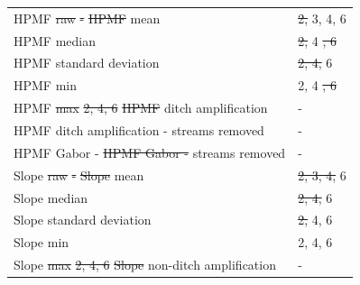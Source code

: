 \documentclass[]{interact}
\theoremstyle{plain}%
\theoremstyle{definition}
\theoremstyle{remark}
\providecommand{\DIFdeltex}[1]{{\protect\color{red}\sout{#1}}}                      %
\providecommand{\DIFdelFL}[1]{\DIFdel{#1}} %
\providecommand{\DIFdelbeginFL}{} %
\providecommand{\DIFdelendFL}{} %
\providecommand{\DIFdel}[1]{\texorpdfstring{\DIFdeltex{#1}}{}} %
\begin{document}
\begin{table} [!htb]
{\begin{tabular}{ll}
      HPMF \DIFdelbeginFL \DIFdelFL{raw }%
\DIFdelFL{- }%
\DIFdelFL{HPMF }\DIFdelendFL mean & \DIFdelbeginFL \DIFdelFL{2, }\DIFdelendFL 3, 4, 6 \\
      HPMF median & \DIFdelbeginFL \DIFdelFL{2, }\DIFdelendFL 4 \DIFdelbeginFL \DIFdelFL{, 6 }\DIFdelendFL \\
      HPMF standard deviation & \DIFdelbeginFL \DIFdelFL{2, 4, }\DIFdelendFL 6 \\
      HPMF min & 2, 4 \DIFdelbeginFL \DIFdelFL{, 6 }\DIFdelendFL \\
      HPMF \DIFdelbeginFL \DIFdelFL{max }%
\DIFdelFL{2, 4, 6 }%
\DIFdelFL{HPMF }\DIFdelendFL ditch amplification & - \\
      HPMF ditch amplification - streams removed & - \\
      HPMF Gabor \DIFdelbeginFL %
\DIFdelendFL - \DIFdelbeginFL %
\DIFdelFL{HPMF Gabor - }\DIFdelendFL streams removed & -\\

      Slope \DIFdelbeginFL \DIFdelFL{raw }%
\DIFdelFL{- }%
\DIFdelFL{Slope }\DIFdelendFL mean & \DIFdelbeginFL \DIFdelFL{2, 3, 4, }\DIFdelendFL 6 \\
      Slope median & \DIFdelbeginFL \DIFdelFL{2, 4, }\DIFdelendFL 6 \\
      Slope standard deviation & \DIFdelbeginFL \DIFdelFL{2, }\DIFdelendFL 4, 6 \\
      Slope min & 2, 4, 6 \\
      Slope \DIFdelbeginFL \DIFdelFL{max }%
\DIFdelFL{2, 4, 6 }%
\DIFdelFL{Slope }\DIFdelendFL non-ditch amplification & - \\ \bottomrule
    \end{tabular}}
    \label{featuretable}
\end{table}
\end{document}
